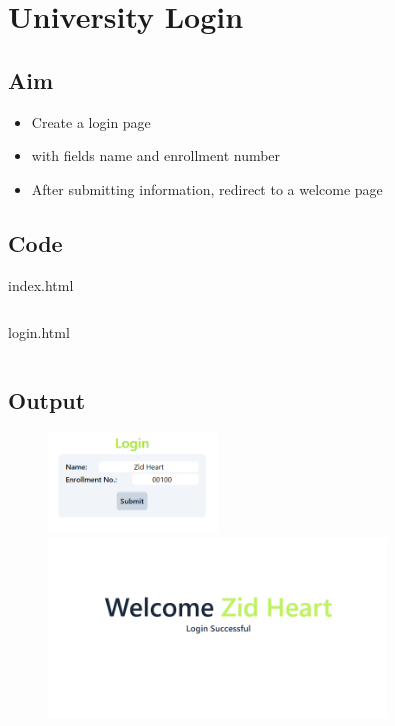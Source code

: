 \documentclass{article}
\begin{document}
\section{University Login}
\subsection{Aim}
\begin{itemize}
	\item Create a login page
	\item with fields name and enrollment number
	\item After submitting information, redirect to a welcome page
\end{itemize}

\subsection{Code}
index.html
\inputminted[frame=lines, breaklines, breakanywhere, numberblanklines=false]{html}{./prog_11/index.html}
\newpage
login.html
\inputminted[frame=lines, breaklines, breakanywhere, numberblanklines=false]{html}{./prog_11/login.html}

\subsection{Output}
\begin{figure}[h!]
	\centering
	\includegraphics[width=0.4\textwidth]{./Assets/p1101.png}
	\includegraphics[width=0.8\textwidth]{./Assets/p1102.png}
\end{figure}
\newpage
\end{document}
